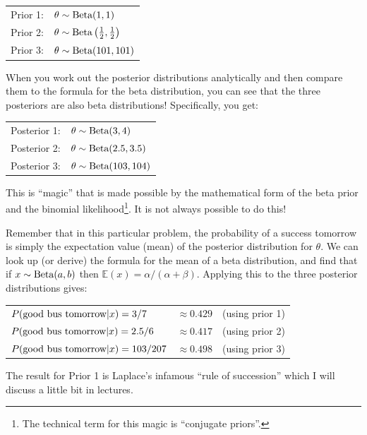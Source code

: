 \begin{table}[ht!]\begin{center}
\begin{tabular}{ll}
Prior 1: & $\theta \sim \textnormal{Beta}(1, 1)$\\
Prior 2: & $\theta \sim \textnormal{Beta}\left(\frac{1}{2}, \frac{1}{2}\right)$\\
Prior 3: & $\theta \sim \textnormal{Beta}(101, 101)$\\
\end{tabular}\end{center}
\end{table}

When you work out the posterior distributions analytically and then compare them
to the formula for the beta distribution, you can see that the three posteriors
are also beta distributions! Specifically, you get:

\begin{table}[ht!]\begin{center}
\begin{tabular}{ll}
Posterior 1: & $\theta \sim \textnormal{Beta}(3, 4)$\\
Posterior 2: & $\theta \sim \textnormal{Beta}(2.5, 3.5)$\\
Posterior 3: & $\theta \sim \textnormal{Beta}(103, 104)$
\end{tabular}\end{center}
\end{table}
This is ``magic'' that is made possible by the mathematical form of the beta
prior and the binomial likelihood\footnote{The technical term for this magic is ``conjugate priors''.}.
It is not always possible to do this!

Remember that in this particular problem, the probability of a success tomorrow
is simply the expectation value (mean) of the posterior distribution for $\theta$.
We can look up (or derive) the formula for the mean of a beta distribution, and find that
if $x \sim \textnormal{Beta}(a, b)$ then $\mathds{E}(x) = \alpha/(\alpha + \beta)$.
Applying this to the three posterior distributions gives:

\begin{table}[ht!]\begin{center}
\begin{tabular}{lll}
$P(\textnormal{good bus tomorrow}|x) = 3/7 $    & $\approx 0.429$ & (using prior 1)\\
$P(\textnormal{good bus tomorrow}|x) = 2.5/6$   & $\approx 0.417$ & (using prior 2)\\
$P(\textnormal{good bus tomorrow}|x) = 103/207$ & $\approx 0.498$ & (using prior 3)
\end{tabular}\end{center}
\end{table}
The result for Prior 1 is Laplace's infamous ``rule of succession'' which I will
discuss a little bit in lectures.

